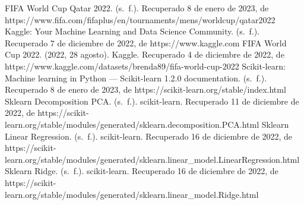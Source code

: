 \begin{thebibliography}{X}
     FIFA World Cup Qatar 2022. (s. f.). Recuperado 8 de enero de 2023, de https://www.fifa.com/fifaplus/en/tournaments/mens/worldcup/qatar2022
     Kaggle: Your Machine Learning and Data Science Community. (s. f.). Recuperado 7 de diciembre de 2022, de https://www.kaggle.com
     FIFA World Cup 2022. (2022, 28 agosto). Kaggle. Recuperado 4 de diciembre de 2022, de https://www.kaggle.com/datasets/brenda89/fifa-world-cup-2022
     Scikit-learn: Machine learning in Python — Scikit-learn 1.2.0 documentation. (s. f.). Recuperado 8 de enero de 2023, de https://scikit-learn.org/stable/index.html
     Sklearn Decomposition PCA. (s. f.). scikit-learn. Recuperado 11 de diciembre de 2022, de https://scikit-learn.org/stable/modules/generated/sklearn.decomposition.PCA.html
     Sklearn Linear Regression. (s. f.). scikit-learn. Recuperado 16 de diciembre de 2022, de https://scikit-learn.org/stable/modules/generated/sklearn.linear\_model.LinearRegression.html
     Sklearn Ridge. (s. f.). scikit-learn. Recuperado 16 de diciembre de 2022, de https://scikit-learn.org/stable/modules/generated/sklearn.linear\_model.Ridge.html
\end{thebibliography}

\newpage
